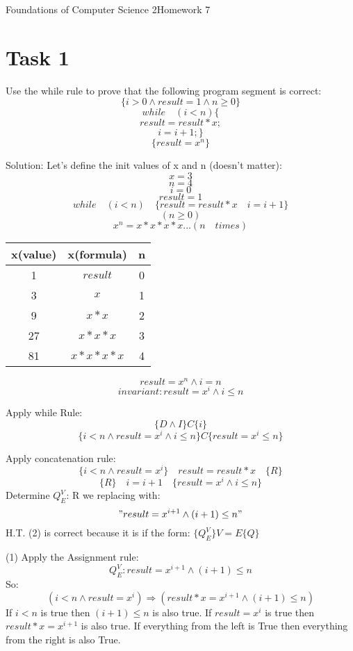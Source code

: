 \documentclass{assignment}
\begin{document}
{Foundations of Computer Science 2}{Homework 7}

\section*{Task 1}
Use the while rule to prove that the following program segment is correct:
\[\{i > 0 \wedge result = 1 \wedge n \geq 0\}\]
\[while \quad (i < n)\{ \]
\[result = result * x;\]
\[i = i + 1;\}\]
\[\{ result = x^n\}\]

Solution:
Let's define the init values of x and n (doesn't matter): 
\[x=3\]
\[n=4\]
\[i = 0\]
\[result = 1 \]
\[while \quad (i<n) \quad \{ result = result * x \quad  i = i+1\}\]
\[(n \geq 0)\]
\[x^n = x*x*x*x... (n \quad times)\]
\begin{center}
    \begin{tabular}{c|c|c}
        \hline
         x(value)& x(formula) & n \\
         \hline
         1 & $result$ & 0 \\
         3 & $x$ & 1 \\
         9 & $x*x$& 2 \\
         27 & $x*x*x$ & 3 \\
         81 & $x*x*x*x$ & 4 \\
         \hline
    \end{tabular}
\end{center}
\[ result = x^n \wedge i = n\]
\[invariant : result = x^i \wedge i \leq n\]


Apply while Rule:
\[\{D \wedge I\} C \{ i\}\]
\[\{i < n \wedge result = x^i \wedge i \leq n\} C \{ result = x^i \leq n\}\]


Apply concatenation rule:
\[\{i < n \wedge result = x^i\} \quad result = result * x \quad \{R\}\]
\[\{R\} \quad i = i + 1 \quad \{result = x^i \wedge i \leq n \}\]
Determine $Q_E^V$:
R we replacing with: \["result = x^{i+1} \wedge (i+1) \leq n"\]
H.T. (2) is correct because it is if the form: $\{Q_E^V\} V=E \{Q\}$


(1) Apply the Assignment rule:
\[Q_E^V : result =x^{i+1} \wedge (i+1) \leq n\]
So:
\[(i< n \wedge result = x^i) \Rightarrow (result * x = x^{i+1} \wedge (i+1) \leq n) \]
If $i < n$ is true then $(i+1) \leq n$ is also true.
If $result = x^i$ is true then $result *x = x^{i+1}$ is also true.
If everything from the left is True then everything from the right is also True.
\end{document}
